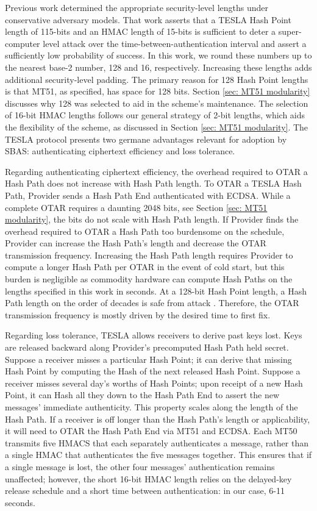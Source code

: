 \documentclass[letterpaper,times]{IONconf/IONconf}
\begin{document}
Previous work determined the appropriate security-level lengths under conservative adversary models\cite{Neish_Dissertation}.
That work asserts that a TESLA Hash Point length of 115-bits and an HMAC length of 15-bits is sufficient to deter a super-computer level attack over the time-between-authentication interval and assert a sufficiently low probability of success.
In this work, we round these numbers up to the nearest base-2 number, 128 and 16, respectively.
Increasing these lengths adds additional security-level padding.
The primary reason for 128 Hash Point lengths is that MT51, as specified, has space for 128 bits.
Section \ref{sec: MT51 modularity} discusses why 128 was selected to aid in the scheme's maintenance.
The selection of 16-bit HMAC lengths follows our general strategy of 2-bit lengths, which aids the flexibility of the scheme, as discussed in Section \ref{sec: MT51 modularity}.
The TESLA protocol presents two germane advantages relevant for adoption by SBAS: authenticating ciphertext efficiency and loss tolerance.

Regarding authenticating ciphertext efficiency, the overhead required to OTAR a Hash Path does not increase with Hash Path length.
To OTAR a TESLA Hash Path, Provider sends a Hash Path End authenticated with ECDSA.
While a complete OTAR requires a daunting 2048 bits, see Section \ref{sec: MT51 modularity}, the bits do not scale with Hash Path length.
If Provider finds the overhead required to OTAR a Hash Path too burdensome on the schedule, Provider can increase the Hash Path's length and decrease the OTAR transmission frequency.
Increasing the Hash Path length requires Provider to compute a longer Hash Path per OTAR in the event of cold start, but this burden is negligible as commodity hardware can compute Hash Paths on the lengths specified in this work in seconds.
At a 128-bit Hash Point length, a Hash Path length on the order of decades is safe from attack \cite{Neish_Dissertation}.
Therefore, the OTAR transmission frequency is mostly driven by the desired time to first fix.

Regarding loss tolerance, TESLA allows receivers to derive past keys lost.
Keys are released backward along Provider's precomputed Hash Path held secret.
Suppose a receiver misses a particular Hash Point; it can derive that missing Hash Point by computing the Hash of the next released Hash Point.
Suppose a receiver misses several day's worths of Hash Points; upon receipt of a new Hash Point, it can Hash all they down to the Hash Path End to assert the new messages' immediate authenticity.
This property scales along the length of the Hash Path.
If a receiver is off longer than the Hash Path's length or applicability, it will need to OTAR the Hash Path End via MT51 and ECDSA.
Each MT50 transmits five HMACS that each separately authenticates a message, rather than a single HMAC that authenticates the five messages together.
This ensures that if a single message is lost, the other four messages' authentication remains unaffected; however, the short 16-bit HMAC length relies on the delayed-key release schedule and a short time between authentication: in our case, 6-11 seconds.
\end{document}
